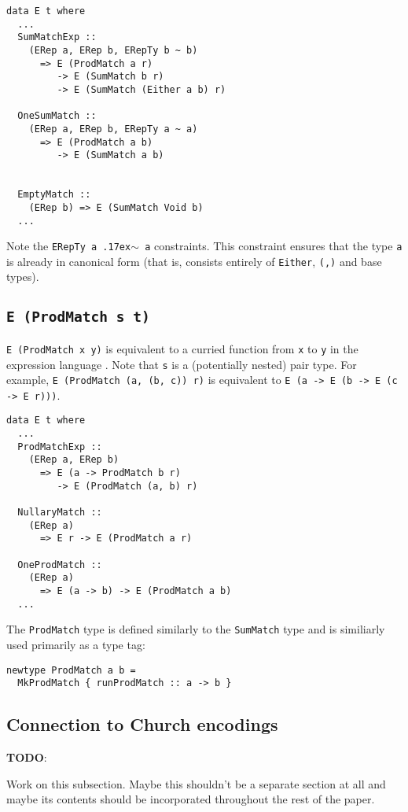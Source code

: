 \documentclass[sigplan,anonymous,review]{acmart}
\newcommand{\typeeq}{\raise.17ex\hbox{$\scriptstyle\mathtt{\sim}$}\,\;}
\newcommand{\ttt}{\texttt}
\newenvironment{todo}
  {\begin{tcolorbox}
   \textbf{TODO}:
  }
  {\end{tcolorbox}
  }
\begin{document}
\begin{lstlisting}
data E t where
  ...
  SumMatchExp ::
    (ERep a, ERep b, ERepTy b ~ b)
      => E (ProdMatch a r)
         -> E (SumMatch b r)
         -> E (SumMatch (Either a b) r)

  OneSumMatch ::
    (ERep a, ERep b, ERepTy a ~ a)
      => E (ProdMatch a b)
         -> E (SumMatch a b)


  EmptyMatch ::
    (ERep b) => E (SumMatch Void b)
  ...
\end{lstlisting}

Note the \ttt{ERepTy a \typeeq a} constraints. This constraint ensures that the type
\ttt{a} is already in canonical form (that is, consists entirely of
\ttt{Either}, \ttt{(,)} and base types).

\subsection{\ttt{E (ProdMatch s t)}}

\ttt{E (ProdMatch x y)} is equivalent to a curried function from \ttt{x} to
\ttt{y} in the expression language .  Note that \ttt{s} is a (potentially
nested) pair type. For example, \ttt{E (ProdMatch (a, (b, c)) r)} is
equivalent to \ttt{E (a -> E (b -> E (c -> E r)))}.

\begin{lstlisting}
data E t where
  ...
  ProdMatchExp ::
    (ERep a, ERep b)
      => E (a -> ProdMatch b r)
         -> E (ProdMatch (a, b) r)

  NullaryMatch ::
    (ERep a)
      => E r -> E (ProdMatch a r)

  OneProdMatch ::
    (ERep a)
      => E (a -> b) -> E (ProdMatch a b)
  ...
\end{lstlisting}

The \ttt{ProdMatch} type is defined similarly to the \ttt{SumMatch} type and is
similiarly used primarily as a type tag:

\begin{lstlisting}
newtype ProdMatch a b =
  MkProdMatch { runProdMatch :: a -> b }
\end{lstlisting}

\subsection{Connection to Church encodings}
\begin{todo}
  Work on this subsection. Maybe this shouldn't be a separate section at all and
  maybe its contents should be incorporated throughout the rest of the paper.
\end{todo}
\end{document}
